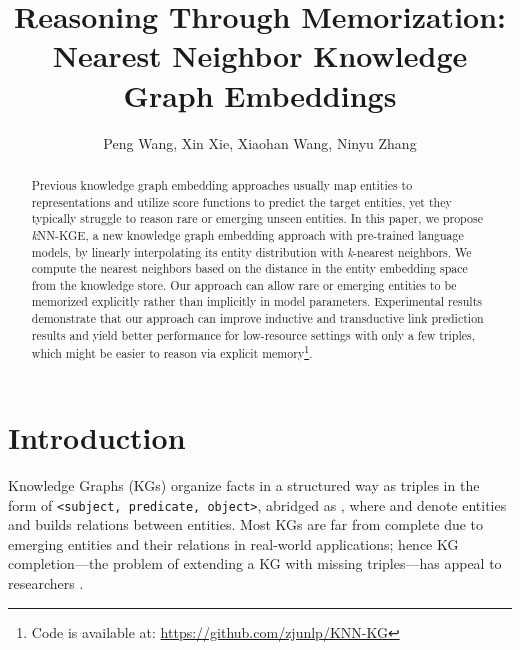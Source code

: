 \documentclass[runningheads]{llncs}
\begin{document}
\title{Reasoning Through Memorization: Nearest Neighbor Knowledge Graph Embeddings}
\newcommand{\ours}{NN-KGE}
\newcommand{\repeatthanks}
{\textsuperscript{\thefootnote}}
\let\origthanks\thanks
\renewcommand\thanks[1]{\begingroup\let\rlap\relax\origthanks{#1}\endgroup}


\author{
Peng Wang,
Xin Xie,
Xiaohan Wang,
Ninyu Zhang
}





\titlerunning{Reasoning Through Memorization: \ours}




\maketitle              \begin{abstract}
Previous knowledge graph embedding approaches usually map entities to representations and utilize score functions to predict the target entities, yet they typically struggle to reason rare or emerging unseen entities. In this paper, we propose \emph{k}NN-KGE, a new knowledge graph embedding approach with pre-trained language models, by linearly interpolating its entity distribution with \emph{k}-nearest neighbors. We compute the nearest neighbors based on the distance in the entity embedding space from the knowledge store. Our approach can allow rare or emerging entities to be memorized explicitly rather than implicitly in model parameters. Experimental results demonstrate that our approach can improve inductive and transductive link prediction results and yield better performance for low-resource settings with only a few triples, which might be easier to reason via explicit memory\footnote{Code is available at: \url{https://github.com/zjunlp/KNN-KG}}.



\end{abstract}
\section{Introduction}


Knowledge Graphs (KGs) organize facts in a structured way as triples in the form of \texttt{<subject, predicate, object>}, abridged as , where  and  denote entities and  builds relations between entities. 
Most KGs are far from complete due to emerging entities and their relations in real-world applications; hence KG completion—the problem of extending a KG with missing triples—has appeal to researchers \cite{transR,DBLP:conf/www/ZhangDSCZC20,DBLP:conf/ijcai/QiZCCXZZ21,DBLP:conf/kdd/ZhangJD0YCTHWHC21,DBLP:conf/ijcai/Chen0YCDHC22,DBLP:conf/sigir/Chen0ZZYXC22,张宁豫2022knowledge,Chen_2022}.
\end{document}
